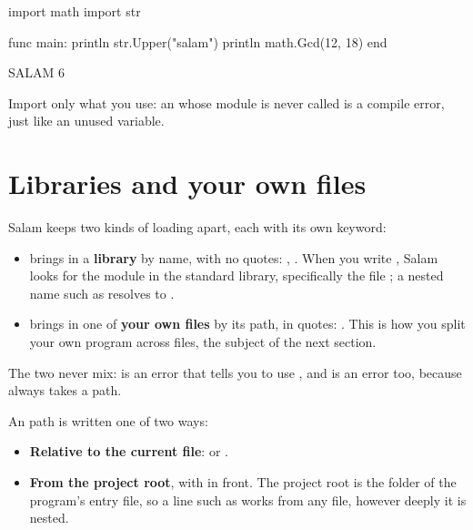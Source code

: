\begin{salamen}
import math
import str

func main:
    println str.Upper("salam")
    println math.Gcd(12, 18)
end
\end{salamen}

\begin{progout}
SALAM
6
\end{progout}

Import only what you use: an  whose module is never called is a
compile error, just like an unused variable.

\section{Libraries and your own files}

Salam keeps two kinds of loading apart, each with its own keyword:

\begin{itemize}[leftmargin=1.4em]
  \item {} brings in a \textbf{library} by name, with no quotes:
        , . When you write
        , Salam looks for the module in the standard library,
        specifically the file ; a nested name such as
         resolves to .
  \item {} brings in one of \textbf{your own files} by its path, in
        quotes: . This is how you split your own
        program across files, the subject of the next section.
\end{itemize}

The two never mix:  is an error that tells you to use
, and  is an error too, because 
always takes a path.

An  path is written one of two ways:

\begin{itemize}[leftmargin=1.4em]
  \item \textbf{Relative to the current file}:  or
        .
  \item \textbf{From the project root}, with  in front. The project
        root is the folder of the program's entry file, so a line such as
         works from any file, however
        deeply it is nested.
\end{itemize}

